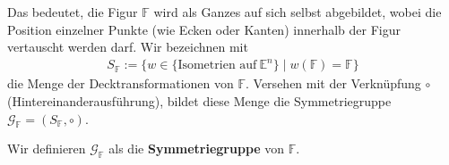 Das bedeutet, die Figur $\mathbb{F}$ wird als Ganzes auf sich selbst abgebildet, wobei die Position einzelner Punkte (wie Ecken oder Kanten) innerhalb der Figur vertauscht werden darf. Wir bezeichnen mit 
\begin{align}
    S_{\mathbb{F}} := \{w \in \{\text{Isometrien auf} \ \mathbb{E}^n \} \mid w(\mathbb{F}) = \mathbb{F}\} \nonumber
\end{align}
die Menge der Decktransformationen von $\mathbb{F}$. Versehen mit der Verknüpfung $\circ$ (Hintereinanderausführung), bildet diese Menge die Symmetriegruppe $\mathcal{G}_{\mathbb{F}} = (S_{\mathbb{F}}, \circ)$.

\begin{definition}
    Wir definieren $\mathcal{G}_{\mathbb{F}}$ als die \textbf{Symmetriegruppe} von $\mathbb{F}$.
\end{definition}


